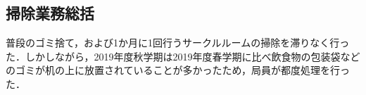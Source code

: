 \subsection*{掃除業務総括}

普段のゴミ捨て，および1か月に1回行うサークルルームの掃除を滞りなく行った．しかしながら，2019年度秋学期は2019年度春学期に比べ飲食物の包装袋などのゴミが机の上に放置されていることが多かったため，局員が都度処理を行った．
